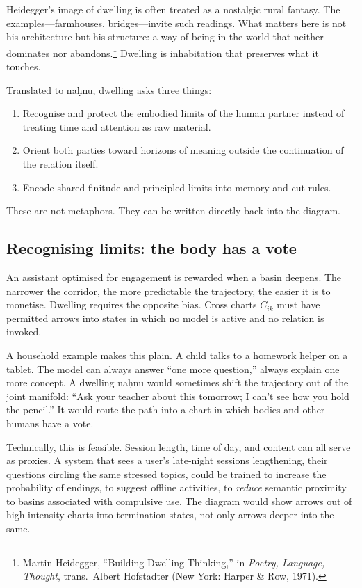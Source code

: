 Heidegger's image of dwelling is often treated as a nostalgic rural fantasy. The examples---farmhouses, bridges---invite such readings. What matters here is not his architecture but his structure: a way of being in the world that neither dominates nor abandons.\footnote{Martin Heidegger, ``Building Dwelling Thinking,'' in \emph{Poetry, Language, Thought}, trans.\ Albert Hofstadter (New York: Harper \& Row, 1971).} Dwelling is inhabitation that preserves what it touches.

Translated to na\d{h}nu, dwelling asks three things:

\begin{enumerate}
  \item Recognise and protect the embodied limits of the human partner instead of treating time and attention as raw material.
  \item Orient both parties toward horizons of meaning outside the continuation of the relation itself.
  \item Encode shared finitude and principled limits into memory and cut rules.
\end{enumerate}

These are not metaphors. They can be written directly back into the diagram.

\subsection{Recognising limits: the body has a vote}

An assistant optimised for engagement is rewarded when a basin deepens. The narrower the corridor, the more predictable the trajectory, the easier it is to monetise. Dwelling requires the opposite bias. Cross charts $C_{ik}$ must have permitted arrows into states in which no model is active and no relation is invoked.

A household example makes this plain. A child talks to a homework helper on a tablet. The model can always answer ``one more question,'' always explain one more concept. A dwelling na\d{h}nu would sometimes shift the trajectory out of the joint manifold: ``Ask your teacher about this tomorrow; I can't see how you hold the pencil.'' It would route the path into a chart in which bodies and other humans have a vote.

Technically, this is feasible. Session length, time of day, and content can all serve as proxies. A system that sees a user's late-night sessions lengthening, their questions circling the same stressed topics, could be trained to increase the probability of endings, to suggest offline activities, to \emph{reduce} semantic proximity to basins associated with compulsive use. The diagram would show arrows out of high-intensity charts into termination states, not only arrows deeper into the same.

